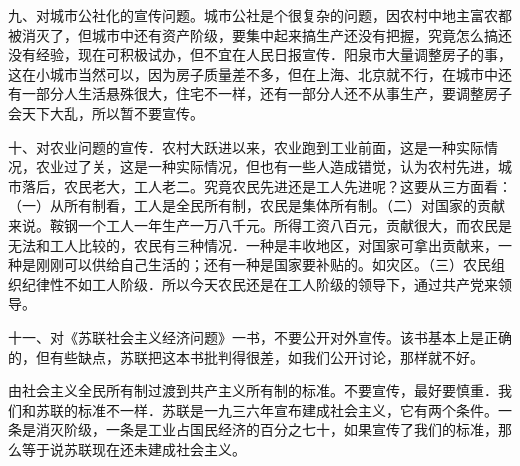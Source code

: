 九、对城市公社化的宣传问题。城市公社是个很复杂的问题，因农村中地主富农都被消灭了，但城市中还有资产阶级，要集中起来搞生产还没有把握，究竟怎么搞还没有经验，现在可积极试办，但不宜在人民日报宣传．阳泉市大量调整房子的事，这在小城市当然可以，因为房子质量差不多，但在上海、北京就不行，在城市中还有一部分人生活悬殊很大，住宅不一样，还有一部分人还不从事生产，要调整房子会天下大乱，所以暂不要宣传。

十、对农业问题的宣传．农村大跃进以来，农业跑到工业前面，这是一种实际情况，农业过了关，这是一种实际情况，但也有一些人造成错觉，认为农村先进，城市落后，农民老大，工人老二。究竟农民先进还是工人先进呢？这要从三方面看：（一）从所有制看，工人是全民所有制，农民是集体所有制。（二）对国家的贡献来说。鞍钢一个工人一年生产一万八千元。所得工资八百元，贡献很大，而农民是无法和工人比较的，农民有三种情况．一种是丰收地区，对国家可拿出贡献来，一种是刚刚可以供给自己生活的；还有一种是国家要补贴的。如灾区。（三）农民组织纪律性不如工人阶级．所以今天农民还是在工人阶级的领导下，通过共产党来领导。

十一、对《苏联社会主义经济问题》一书，不要公开对外宣传。该书基本上是正确的，但有些缺点，苏联把这本书批判得很差，如我们公开讨论，那样就不好。

由社会主义全民所有制过渡到共产主义所有制的标准。不要宣传，最好要慎重．我们和苏联的标准不一样．苏联是一九三六年宣布建成社会主义，它有两个条件。一条是消灭阶级，一条是工业占国民经济的百分之七十，如果宣传了我们的标准，那么等于说苏联现在还未建成社会主义。


